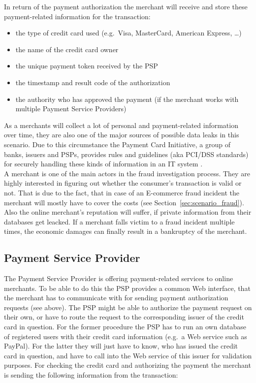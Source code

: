 In return of the payment authorization the merchant will receive and store these  payment-related information for the transaction:\@

\begin{itemize}
		\item the type of credit card used (e.g.\ Visa, MasterCard, American Express, \ldots)
		\item the name of the credit card owner
		\item the unique payment token received by the \gls{PSP}
		\item the timestamp and result code of the authorization
		\item the authority who has approved the payment (if the merchant works with multiple Payment Service Providers)
\end{itemize}

As a merchants will collect a lot of personal and payment-related information over time, they are also one of the major sources of possible data leaks in this scenario. Due to this circumstance the Payment Card Initiative, a group of banks, issuers and \gls{PSP}s, provides rules and guidelines (aka \gls{PCI/DSS} standards) for securely handling these kinds of information in an \gls{IT} system \citep{virtue2009payment}. \\

A merchant is one of the main actors in the fraud investigation process. They are highly interested in figuring out whether the consumer's transaction is valid or not. That is due to the fact, that in case of an \gls{E-commerce} fraud incident the merchant will mostly have to cover the costs (see Section~\ref{sec:scenario_fraud}). Also the online merchant's reputation will suffer, if private information from their databases get leacked. If a merchant falls victim to a fraud incident multiple times, the economic damages can finally result in a bankruptcy of the merchant.


\subsection{Payment Service Provider}
\label{subsec:stakeholder_psp}

The Payment Service Provider is offering payment-related services to online merchants. To be able to do this the \gls{PSP} provides a common Web interface, that the merchant has to communicate with for sending payment authorization requests (see above). The \gls{PSP} might be able to authorize the payment request on their own, or have to route the request to the corresponding issuer of the credit card in question. For the former procedure the \gls{PSP} has to run an own database of registered users with their credit card information (e.g.\ a Web service such as PayPal). For the latter they will just have to know, who has issued the credit card in question, and have to call into the Web service of this issuer for validation purposes. For checking the credit card and authorizing the payment the merchant is sending the following information from the transaction:\@

